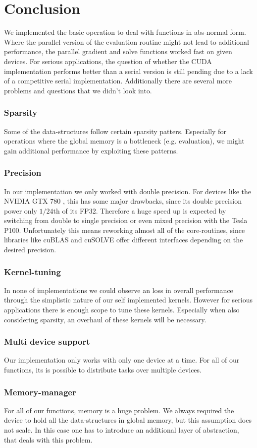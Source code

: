 \section{Conclusion}

We implemented the basic operation to deal with functions in abs-normal form. Where the parallel version of the evaluation routine might not lead to additional performance, the parallel gradient and solve functions worked fast on given devices. For serious applications, the question of whether the CUDA implementation performs better than a serial version is still pending due to a lack of a competitive serial implementation. Additionally there are several more problems and questions that we didn't look into.

\subsubsection{Sparsity}
Some of the data-structures follow certain sparsity patters. Especially for operations where the global memory is a bottleneck (e.g. evaluation), we might gain additional performance by exploiting these patterns.

\subsubsection{Precision}
In our implementation we only worked with double precision. For devices like the NVIDIA GTX 780 , this has some major drawbacks, since its double precision power only $1/24$th of its FP32. Therefore a huge speed up is expected by switching from double to single precision or even mixed precision with the Tesla P100.
Unfortunately this means reworking almost all of the core-routines, since libraries like cuBLAS and cuSOLVE offer different interfaces depending on the desired precision.

\subsubsection{Kernel-tuning}
In none of implementations we could observe an loss in overall performance through the simplistic nature of our self implemented kernels. However for serious applications there is enough scope to tune these kernels. Especially when also considering sparsity, an overhaul of these kernels will be necessary.

\subsubsection{Multi device support}
Our implementation only works with only one device at a time. For all of our functions, its is possible to distribute tasks over multiple devices.

\subsubsection{Memory-manager}
For all of our functions, memory is a huge problem. We always required the device to hold all the data-structures in global memory, but this assumption does not scale. In this case one has to introduce an additional layer of abstraction, that deals with this problem. 